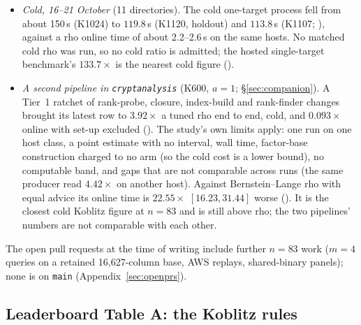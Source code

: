 \begin{itemize}
  memory was faster online in every pair run: IC/rho $3.74$
  $[2.65,11.05]$ (K3300, time-matched), $40.61$ (K3300, memory-matched),
  and $81.5$--$395.5$ (K600)
  (). Only the K3300 and
  K600 bases were paired; the K3072 reading was not, so its retirement rests
  on the same mechanism rather than on its own measurement. The validation
  sweep and the ledger audit retired all the online readings on 19--20
  October.
\item \emph{Cold, 16--21 October} (11 directories). The cold one-target
  process fell from about 150\,s (K1024) to $119.8$\,s (K1120, holdout) and
  $113.8$\,s (K1107; ), against
  a rho online time of about 2.2--2.6\,s on the same hosts. No matched cold
  rho was run, so no cold ratio is admitted; the hosted single-target
  benchmark's $133.7\times$ is the nearest cold figure
  ().
\item \emph{A second pipeline in \texttt{cryptanalysis}} (K600, $a=1$;
  \S\ref{sec:companion}). A Tier~1 ratchet of rank-probe, closure,
  index-build and rank-finder changes brought its latest row to $3.92\times$
  a tuned rho end to end, cold, and $0.093\times$ online with set-up
  excluded ().
  The study's own limits apply: one run on one host class, a point estimate
  with no interval, wall time, factor-base construction charged to no arm (so
  the cold cost is a lower bound), no computable band, and gaps that are not
  comparable across runs (the same producer read $4.42\times$ on another host).
  Against Bernstein--Lange rho with equal advice its online time is
  $22.55\times$ $[16.23,31.44]$ worse
  (). It is the
  closest cold Koblitz figure at $n=83$ and is still above rho; the two
  pipelines' numbers are not comparable with each other.
\end{itemize}
The open pull requests at the time of writing include further $n=83$ work
($m=4$ queries on a retained 16{,}627-column base, AWS replays, shared-binary
panels); none is on \texttt{main} (Appendix~\ref{sec:openprs}).

\subsection{Leaderboard Table A: the Koblitz rules}\label{sec:tablea}

